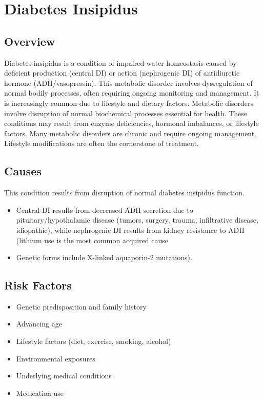 \chapter{Diabetes Insipidus}
\label{sec:Diabetes Insipidus}

\section{Overview}
Diabetes insipidus is a condition of impaired water homeostasis caused by deficient production (central DI) or action (nephrogenic DI) of antidiuretic hormone (ADH/vasopressin). This metabolic disorder involves dysregulation of normal bodily processes, often requiring ongoing monitoring and management. It is increasingly common due to lifestyle and dietary factors. Metabolic disorders involve disruption of normal biochemical processes essential for health. These conditions may result from enzyme deficiencies, hormonal imbalances, or lifestyle factors. Many metabolic disorders are chronic and require ongoing management. Lifestyle modifications are often the cornerstone of treatment.
\section{Causes}
This condition results from disruption of normal diabetes insipidus function.

\begin{itemize}[noitemsep]
  \item Central DI results from decreased ADH secretion due to pituitary/hypothalamic disease (tumors, surgery, trauma, infiltrative disease, idiopathic), while nephrogenic DI results from kidney resistance to ADH (lithium use is the most common acquired cause
  \item Genetic forms include X-linked aquaporin-2 mutations).
\end{itemize}
\section{Risk Factors}
\begin{itemize}[noitemsep]
  \item Genetic predisposition and family history
  \item Advancing age
  \item Lifestyle factors (diet, exercise, smoking, alcohol)
  \item Environmental exposures
  \item Underlying medical conditions
  \item Medication use
\end{itemize}
